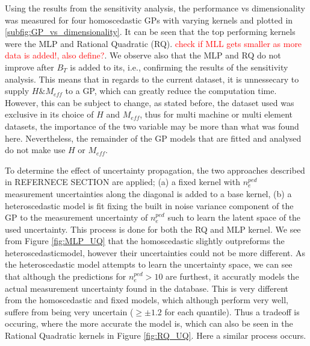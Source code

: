 \documentclass[a4paper, twoside, final, 12pt]{article}
\begin{document}
{Using the results from the sensitivity analysis, the performance vs dimensionality was measured for four homoscedastic GPs with varying kernels and plotted in \ref{subfig:GP_vs_dimensionality}. It can be seen that the top performing kernels were the MLP and Rational Quadratic (RQ). \textcolor{red}{check if MLL gets smaller as more data is added!, also define?}. We observe also that the MLP and RQ do not improve after $B_T$ is added to its, i.e., confirming the results of the sensitivity analysis. This means that in regards to the current dataset, it is unnessecary to supply $H \& M_{eff}$ to a GP, which can greatly reduce the computation time. However, this can be subject to change, as stated before, the dataset used was exclusive in its choice of $H$ and $M_{eff}$, thus for multi machine or multi element datasets, the importance of the two variable may be more than what was found here. Nevertheless, the remainder of the GP models that are fitted and analysed do not make use $H$ or $M_{eff}$. 

To determine the effect of uncertainty propagation, the two approaches described in REFERNECE SECTION are applied; (a) a fixed kernel with $n_e^{ped}$ measurement uncertainties along the diagonal is added to a base kernel, (b) a heteroscedastic model is fit fixing the built in noise variance component of the GP to the measurement uncertainty of $n_e^{ped}$ such to learn the latent space of the used uncertainty. This process is done for both the RQ and MLP kernel.
We see from Figure \ref{fig:MLP_UQ} that the homoscedastic slightly outpreforms the heteroscedasticmodel, however their uncertainties could not be more different. As the heteroscedastic model attempts to learn the uncertainty space, we can see that although the predictions for $n_e^{ped} > 10$ are furthest, it accuratly models the actual measurement uncertainty found in the database. This is very different from the homoscedastic and fixed models, which although perform very well, suffere from being very uncertain ($ \geq \pm 1.2$ for each quantile). Thus a tradeoff is occuring, where the more accurate the model is, which can also be seen in the Rational Quadratic kernels in Figure \ref{fig:RQ_UQ}. Here a similar process occurs.   

}
\end{document}
